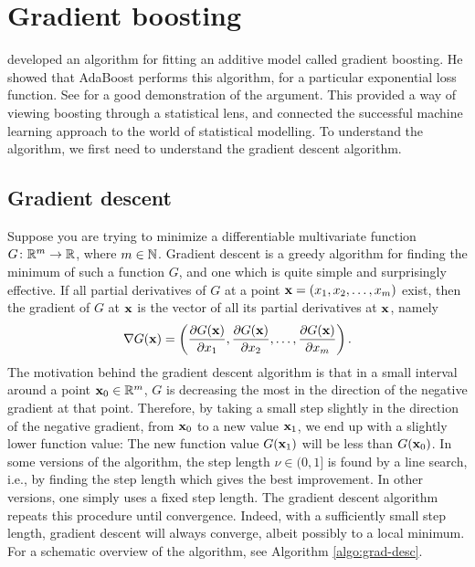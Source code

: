 \section{Gradient boosting}
\citet{friedman2001} developed an algorithm for fitting an additive model called gradient boosting. He showed that AdaBoost performs this algorithm, for a particular exponential loss function. See \citet{ESL} for a good demonstration of the argument. This provided a way of viewing boosting through a statistical lens, and connected the successful machine learning approach to the world of statistical modelling. To understand the algorithm, we first need to understand the gradient descent algorithm.

\subsection{Gradient descent}
Suppose you are trying to minimize a differentiable multivariate function $G\colon\mathbb{R}^m\to\mathbb{R}$, where $m\in\mathbb{N}$. Gradient descent is a greedy algorithm for finding the minimum of such a function $G$, and one which is quite simple and surprisingly effective. If all partial derivatives of $G$ at a point $\mathbf{x}=(x_1,x_2,\ldots,x_m)$ exist, then the gradient of $G$ at $\mathbf{x}$ is the vector of all its partial derivatives at $\mathbf{x}$, namely
\begin{equation}
    \nabla G(\mathbf{x})=\left(\frac{\partial G(\mathbf{x})}{\partial x_1},\frac{\partial G(\mathbf{x})}{\partial x_2},\ldots,\frac{\partial G(\mathbf{x})}{\partial x_m}\right).
\end{equation}
The motivation behind the gradient descent algorithm is that in a small interval around a point $\mathbf{x}_0\in\mathbb{R}^m$, $G$ is decreasing the most in the direction of the negative gradient at that point. Therefore, by taking a small step slightly in the direction of the negative gradient, from $\mathbf{x}_0$ to a new value $\mathbf{x}_1$, we end up with a slightly lower function value: The new function value $G(\mathbf{x}_1)$ will be less than $G(\mathbf{x}_0)$. In some versions of the algorithm, the step length $\nu\in(0,1]$ is found by a line search, i.e., by finding the step length which gives the best improvement. In other versions, one simply uses a fixed step length. The gradient descent algorithm repeats this procedure until convergence. Indeed, with a sufficiently small step length, gradient descent will always converge, albeit possibly to a local minimum. For a schematic overview of the algorithm, see Algorithm \ref{algo:grad-desc}.
